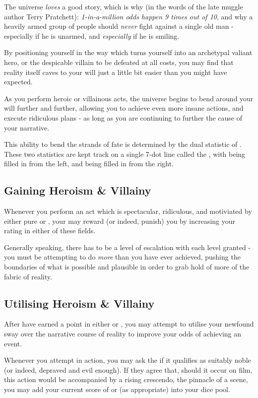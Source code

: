The universe {\it loves} a good story, which is why (in the words of the late muggle author Terry Pratchett): {\it 1-in-a-million odds happen 9 times out of 10}, and why a heavily armed group of people should {\it never} fight against a single old man - especially if he is unarmed, and {\it especially} if he is smiling. 

By positioning yourself in the way which turns yourself into an archetypal valiant hero, or the despicable villain to be defeated at all costs, you may find that reality itself caves to your will just a little bit easier than you might have expected. 

As you perform heroic or villainous acts, the universe begins to bend around your will further and further, allowing you to achieve even more insane actions, and execute ridiculous plans - as long as you are continuing to further the cause of your narrative. 

This ability to bend the strands of fate is determined by the dual statistic of . These two statistics are kept track on a single 7-dot line called the , with  being filled in from the left, and  being filled in from the right. 

\subsection{Gaining Heroism \& Villainy}

Whenever you perform an act which is spectacular, ridiculous, and motiviated by either pure  or , your  may reward (or indeed, punish) you by increasing your rating in either of these fields. 

Generally speaking, there has to be a level of escalation with each level granted - you must be attempting to do {\it more} than you have ever achieved, pushing the boundaries of what is possible and plausible in order to grab hold of more of the fabric of reality. 

\subsection{Utilising Heroism \& Villainy}

After have earned a point in either  or , you may attempt to utilise your newfound sway over the narrative course of reality to improve your odds of achieving an event. 

Whenever you attempt in action, you may ask the  if it qualifies as suitably noble (or indeed, depraved and evil enough). If they agree that, should it occur on film, this action would be accompanied by a rising crescendo, the pinnacle of a scene, you may add your current score of  or  (as appropriate) into your dice pool. 

